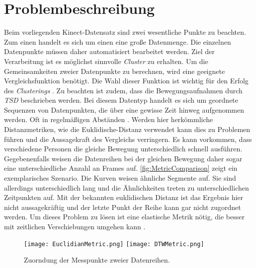 \section{Problembeschreibung}
\label{chapter2-Problembeschreibung}
Beim vorliegenden Kinect-Datensatz sind zwei wesentliche Punkte zu beachten.
Zum einen handelt es sich um einen eine große Datenmenge.
Die einzelnen Datenpunkte müssen daher automatisiert bearbeitet werden.
Ziel der Verarbeitung ist es möglichst sinnvolle \emph{Cluster} zu erhalten.
Um die Gemeinsamkeiten zweier Datenpunkte zu berechnen,
wird eine geeignete Vergleichsfunktion benötigt.
Die Wahl dieser Funktion ist wichtig für den Erfolg des \emph{Clusterings} \citep{warren_liao_clustering_2005}.
Zu beachten ist zudem, dass die Bewegungsaufnahmen durch \emph{\ac{TSD}} beschrieben werden.
Bei diesem Datentyp handelt es sich um geordnete Sequenzen von Datenpunkten,
die über eine gewisse Zeit hinweg aufgenommen werden.
Oft in regelmäßigen Abständen \citep{ali_clustering_2019}.
Werden hier herkömmliche Distanzmetriken, wie die Euklidische-Distanz verwendet
kann dies zu Problemen führen und die Aussagekraft des Vergleichs verringern.
Es kann vorkommen, dass verschiedene Personen die gleiche Bewegung unterschiedlich schnell ausführen.
Gegebenenfalls weisen die Datenreihen bei der gleichen Bewegung daher sogar eine unterschiedliche Anzahl an Frames auf.
\autoref{fig:MetricComparison} zeigt ein exemplarisches Szenario.
Die Kurven weisen ähnliche Segmente auf.
Sie sind allerdings unterschiedlich lang und die Ähnlichkeiten treten zu unterschiedlichen Zeitpunkten auf.
Mit der bekannten euklidischen Distanz ist das Ergebnis hier nicht aussagekräftig
und der letzte Punkt der Reihe kann gar nicht zugordnet werden.
Um dieses Problem zu lösen ist eine elastische Metrik nötig,
die besser mit zeitlichen Verschiebungen umgehen kann \citep{aghabozorgi_time-series_2015}.

\begin{figure}[ht]
    \begin{center}
    \texttt{[image: EuclidianMetric.png]}
    \texttt{[image: DTWMetric.png]}
    \end{center}
    \caption{Zuorndung der Messpunkte zweier Datenreihen.}
    \label{fig:MetricComparison}
\end{figure}

